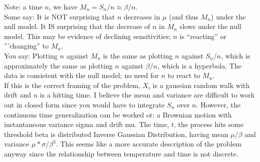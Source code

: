 \documentclass[11pt,letter]{article}
\begin{document}
Note: a time $n$, we have $M_n = S_n / n \approx \beta / n$.\\

Some say: It is NOT surprising that $n$ decreases in $\mu$ (and thus $M_n$) under the null model. It IS surprising that the decrease of $n$ in $M_n$ slows under the null model. This may be evidence of declining sensitivities; $n$ is ``reacting'' or '''changing'' to $M_n$.\\

You say: Plotting $n$ against $M_n$ is the same as plotting $n$ against $S_n / n$, which is approximately the same as plotting $n$ against $\beta/n$, which is a hyperbola. The data is consistent with the null model; no need for $n$ to react to $M_n$.\\

If this is the correct framing of the problem, $X_i$ is a gaussian random walk with drift and $n$ is a hitting time. I believe the mean and variance are difficult to work out in closed form since you would have to integrate $S_n$ over $n$. However, the continuous time generalization can be worked ot: a Brownian motion with instantaneous variance sigma and drift mu. The time, $t$, the process hits some threshold beta is distributed Inverse Gaussian Distribution, having mean $\mu/\beta$ and variance $\mu * \sigma / \beta^3$. This seems like a more accurate description of the problem anyway since the relationship between temperature and time is not discrete. \\
\end{document}
